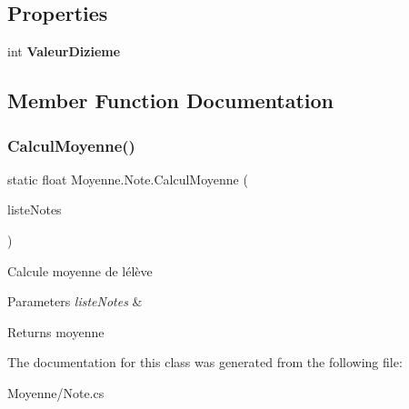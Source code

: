 \subsection*{Properties}
\begin{DoxyCompactItemize}
\item 
\mbox{\label{class_moyenne_1_1_note_a911af875364929c6de36718f8330fa5b}} 
int {\bfseries Valeur\+Dizieme}
\end{DoxyCompactItemize}


\subsection{Member Function Documentation}
\mbox{\label{class_moyenne_1_1_note_afcbbe7434fea2a87085b201dc07289a4}} 
\subsubsection{\texorpdfstring{Calcul\+Moyenne()}{CalculMoyenne()}}
{\footnotesize\ttfamily static float Moyenne.\+Note.\+Calcul\+Moyenne (\begin{DoxyParamCaption}\item[{List\+Box}]{liste\+Notes }\end{DoxyParamCaption})\hspace{0.3cm}{\ttfamily [static]}}



Calcule moyenne de l\textquotesingle{}élève 


\begin{DoxyParams}{Parameters}
{\em liste\+Notes} & \\
\hline
\end{DoxyParams}
\begin{DoxyReturn}{Returns}
moyenne
\end{DoxyReturn}


The documentation for this class was generated from the following file\+:\begin{DoxyCompactItemize}
\item 
Moyenne/Note.\+cs\end{DoxyCompactItemize}
